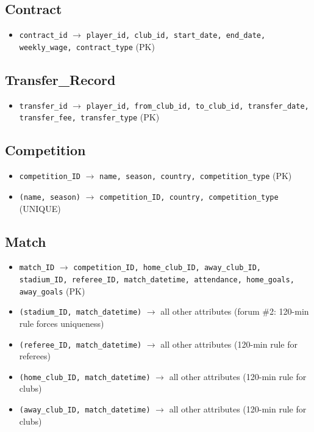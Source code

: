 \documentclass[11pt]{article}
\begin{document}
\subsection*{Contract}
\begin{itemize}[leftmargin=*]
  \item \texttt{contract\_id} $\to$ \texttt{player\_id, club\_id, start\_date, end\_date, weekly\_wage, contract\_type} \hfill (PK)
\end{itemize}

\subsection*{Transfer\_Record}
\begin{itemize}[leftmargin=*]
  \item \texttt{transfer\_id} $\to$ \texttt{player\_id, from\_club\_id, to\_club\_id, transfer\_date, transfer\_fee, transfer\_type} \hfill (PK)
\end{itemize}

\subsection*{Competition}
\begin{itemize}[leftmargin=*]
  \item \texttt{competition\_ID} $\to$ \texttt{name, season, country, competition\_type} \hfill (PK)
  \item \texttt{(name, season)} $\to$ \texttt{competition\_ID, country, competition\_type} \hfill (UNIQUE)
\end{itemize}

\subsection*{Match}
\begin{itemize}[leftmargin=*]
  \item \texttt{match\_ID} $\to$ \texttt{competition\_ID, home\_club\_ID, away\_club\_ID, stadium\_ID, referee\_ID, match\_datetime, attendance, home\_goals, away\_goals} \hfill (PK)
  \item \texttt{(stadium\_ID, match\_datetime)} $\to$ all other attributes \hfill (forum \#2: 120-min rule forces uniqueness)
  \item \texttt{(referee\_ID, match\_datetime)} $\to$ all other attributes \hfill (120-min rule for referees)
  \item \texttt{(home\_club\_ID, match\_datetime)} $\to$ all other attributes \hfill (120-min rule for clubs)
  \item \texttt{(away\_club\_ID, match\_datetime)} $\to$ all other attributes \hfill (120-min rule for clubs)
\end{itemize}
\end{document}
